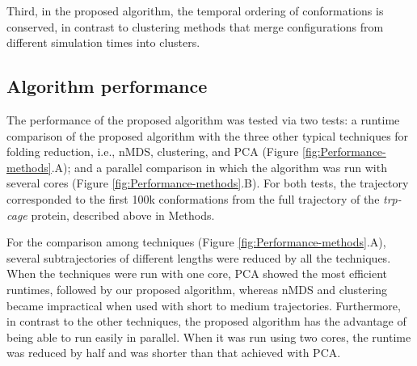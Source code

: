 \documentclass[twocolumn]{bmcart}%
\begin{document}
Third, in the proposed algorithm, the temporal ordering of conformations is conserved, in contrast to clustering methods \cite{Peng2018} that merge configurations from different simulation times into clusters.



\subsection*{Algorithm performance}

The performance of the proposed algorithm was tested via two tests: a runtime comparison of the proposed algorithm with the three other typical techniques for folding reduction, i.e., nMDS, clustering, and PCA (Figure \ref{fig:Performance-methods}.A); and a parallel comparison in which the algorithm was run with several cores (Figure \ref{fig:Performance-methods}.B). For both tests, the trajectory corresponded to the first 100k conformations from the full trajectory of the \emph{trp-cage} protein, described above in Methods.

For the comparison among techniques (Figure \ref{fig:Performance-methods}.A), several subtrajectories of different lengths were reduced by all the techniques. When the techniques were run with one core, PCA showed the most efficient runtimes, followed by our proposed algorithm, whereas nMDS and clustering became impractical when used with short to medium trajectories. Furthermore, in contrast to the other techniques, the proposed algorithm has the advantage of being able to run easily in parallel. When it was run using two cores, the runtime was reduced by half and was shorter than that achieved with PCA.
\end{document}
